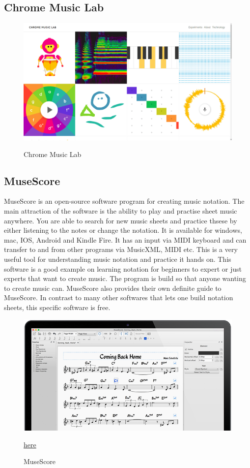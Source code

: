 	\subsection{Chrome Music Lab}
		\begin{figure}[H]
			\centering
			\includegraphics[width=0.8\linewidth]{figure/Analysis/chromeMusicLab.png}
			\label{fig:chromeMusicLab}
			\caption{Chrome Music Lab}
		\end{figure}

	\subsection{MuseScore}
	MuseScore is an open-source software program for creating music notation. The main attraction of the software is the ability to play and practise sheet music anywhere. You are able to search for new music sheets and practice thsese by either listening to the notes or change the notation. It is available for windows, mac, IOS, Android and Kindle Fire. It has an input via MIDI keyboard and can transfer to and from other programs via MusicXML, MIDI etc. This is a very useful tool for understanding music notation and practice it hands on. This software is a good example on learning notation for beginners to expert or just experts that want to create music. The program is build so that anyone wanting to create music can. MuseScore also provides their own definite guide to MuseScore. In contrast to many other softwares that lets one build notation sheets, this specific software is free. 
	
		\begin{figure}[H]
			\centering
			\includegraphics[width=0.8\linewidth]{figure/Analysis/musescore.png}
			\label{fig:MuseScore}
			\caption{MuseScore}
			\href{https://musescore.org/da}{\color{blue}here}
		\end{figure}
	
